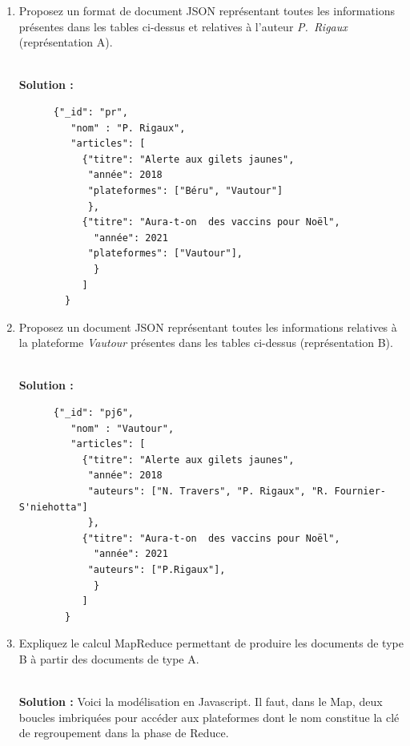 \documentclass[11pt,a4paper]{article}
\newenvironment{solution}[0]{
~\\ \color{red} \textbf{Solution : }\color{black}}{%
}
\begin{document}
\begin{enumerate}
  \item Proposez un format de document JSON représentant toutes les informations présentes dans les  
        tables ci-dessus et
        relatives à l'auteur \emph{P.~Rigaux} (représentation A).


\begin{solution}
    \begin{small}
    \begin{verbatim}
      {"_id": "pr",
         "nom" : "P. Rigaux",
         "articles": [
           {"titre": "Alerte aux gilets jaunes", 
            "année": 2018
            "plateformes": ["Béru", "Vautour"]
            },
           {"titre": "Aura-t-on  des vaccins pour Noël", 
             "année": 2021
            "plateformes": ["Vautour"],
             }
           ]
        }
    \end{verbatim}
    \end{small}
\end{solution}

  \item Proposez un document JSON représentant toutes les 
        informations relatives à la plateforme \emph{Vautour} 
        présentes dans les tables ci-dessus
         (représentation B).
        

\begin{solution}
    \begin{small}
    \begin{verbatim}
      {"_id": "pj6",
         "nom" : "Vautour",
         "articles": [
           {"titre": "Alerte aux gilets jaunes", 
            "année": 2018
            "auteurs": ["N. Travers", "P. Rigaux", "R. Fournier-S'niehotta"]
            },
           {"titre": "Aura-t-on  des vaccins pour Noël", 
             "année": 2021
            "auteurs": ["P.Rigaux"],
             }
           ]
        }
    \end{verbatim}
    \end{small}
\end{solution}


   \item Expliquez le calcul MapReduce permettant de produire les documents
   de type B à partir des documents de type A.


\begin{solution}
   Voici la modélisation en Javascript. Il faut, dans le Map, deux boucles imbriquées pour 
      accéder aux plateformes dont le nom constitue la clé de regroupement dans la phase de Reduce. 


\end{solution}
\end{enumerate}
\end{document}
